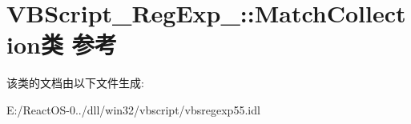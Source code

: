\hypertarget{class_v_b_script___reg_exp__55_1_1_match_collection}{}\section{V\+B\+Script\+\_\+\+Reg\+Exp\+\_\+:\+:Match\+Collection类 参考}
\label{class_v_b_script___reg_exp__55_1_1_match_collection}


该类的文档由以下文件生成\+:\begin{DoxyCompactItemize}
\item 
E\+:/\+React\+O\+S-\/0../dll/win32/vbscript/vbsregexp55.\+idl\end{DoxyCompactItemize}
